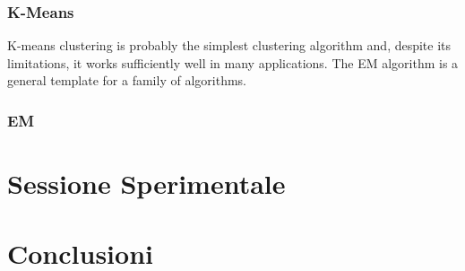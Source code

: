 \documentclass{llncs}
\begin{document}
	\subsubsection{K-Means}
	K-means clustering is probably the simplest
	clustering algorithm and, despite its limitations, it works sufficiently well
	in many applications. The EM algorithm is a general template for a family
	of algorithms.

	\subsubsection{EM}
    \section{Sessione Sperimentale}
    \section{Conclusioni}
    
\end{document}
